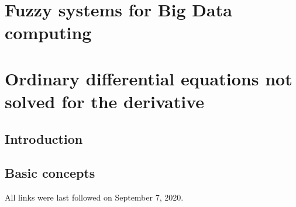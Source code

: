 \documentclass[
  fontsize=12pt,
  a4paper,  %
  twoside,  %
  bibliography=totoc,
  headsepline,
  cleardoublepage=empty,
  draft=false
]{scrbook}
\theoremstyle{nonumberplain}
\begin{document}
%
%
\mainmatter

\part{Fuzzy systems for Big Data computing}

%

%

\part{Ordinary differential equations not solved for the derivative}

\chapter{Introduction}
\label{chap:k1}


\chapter{Basic concepts}






\printnoidxglossaries
{}
\cleardoublepage

%
%


\nocite{*}
\printbibliography

\noindent All links were last followed on September 7, 2020.
\end{document}
